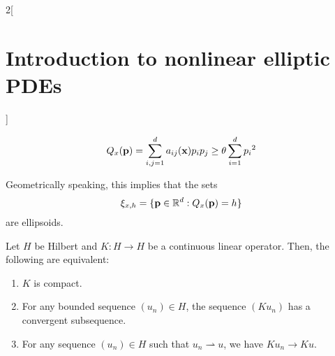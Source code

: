 \documentclass[../../../main_math.tex]{subfiles}
\begin{document}
\begin{multicols}{2}[\section{Introduction to nonlinear elliptic PDEs}]
\begin{definition}
\begin{equation}
      Q_x(\boldsymbol{\mathrm{p}})=\sum_{i,j=1}^da_{ij}(\boldsymbol{\mathrm{x}})p_ip_j\geq \theta \sum_{i=1}^{d} {p_i}^2
    \end{equation}
  \end{definition}
  \begin{remark}
    Geometrically speaking, this implies that the sets
    $$
      \xi_{x,h}=\{ \boldsymbol{\mathrm{p}}\in \mathbb{R}^d: Q_x(\boldsymbol{\mathrm{p}})=h\}
    $$
    are ellipsoids.
  \end{remark}
  \begin{proposition}
    Let $H$ be Hilbert and $K:H\to H$ be a continuous linear operator. Then, the following are equivalent:
    \begin{enumerate}
      \item $K$ is compact.
      \item For any bounded sequence $(u_n)\in H$, the sequence $(Ku_n)$ has a convergent subsequence.
      \item For any sequence $(u_n)\in H$ such that $u_n\rightharpoonup u$, we have $Ku_n\to Ku$.
    \end{enumerate}
  \end{proposition}

\end{multicols}
\end{document}
